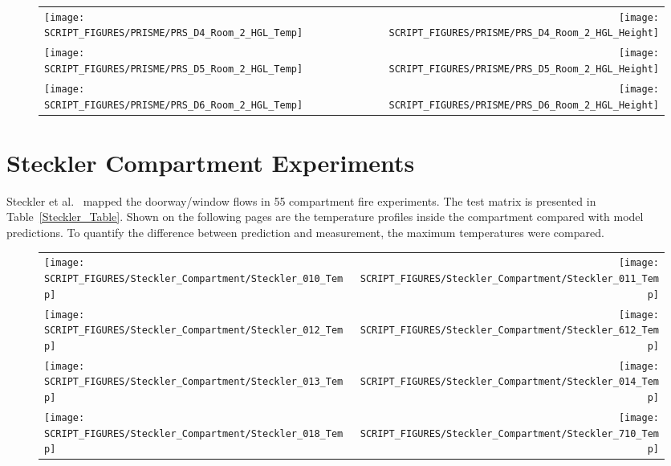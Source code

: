 \begin{figure}[p]
\begin{tabular*}{\textwidth}{l@{\extracolsep{\fill}}r}
\texttt{[image: SCRIPT\_FIGURES/PRISME/PRS\_D4\_Room\_2\_HGL\_Temp]} &
\texttt{[image: SCRIPT\_FIGURES/PRISME/PRS\_D4\_Room\_2\_HGL\_Height]} \\
\texttt{[image: SCRIPT\_FIGURES/PRISME/PRS\_D5\_Room\_2\_HGL\_Temp]} &
\texttt{[image: SCRIPT\_FIGURES/PRISME/PRS\_D5\_Room\_2\_HGL\_Height]} \\
\texttt{[image: SCRIPT\_FIGURES/PRISME/PRS\_D6\_Room\_2\_HGL\_Temp]} &
\texttt{[image: SCRIPT\_FIGURES/PRISME/PRS\_D6\_Room\_2\_HGL\_Height]}
\end{tabular*}
\label{PRISME_HGL_4}
\end{figure}


\clearpage

\section{Steckler Compartment Experiments}

Steckler et al.~\cite{Steckler:NBSIR_82-2520} mapped the doorway/window flows in 55 compartment fire experiments. The test matrix is presented in Table~\ref{Steckler_Table}. Shown on the following pages are the temperature profiles inside the compartment compared with model predictions. To quantify the difference between prediction and measurement, the maximum temperatures were compared.

\newpage

\begin{figure}[p]
\begin{tabular*}{\textwidth}{l@{\extracolsep{\fill}}r}
\texttt{[image: SCRIPT\_FIGURES/Steckler\_Compartment/Steckler\_010\_Temp]} &
\texttt{[image: SCRIPT\_FIGURES/Steckler\_Compartment/Steckler\_011\_Temp]} \\
\texttt{[image: SCRIPT\_FIGURES/Steckler\_Compartment/Steckler\_012\_Temp]} &
\texttt{[image: SCRIPT\_FIGURES/Steckler\_Compartment/Steckler\_612\_Temp]} \\
\texttt{[image: SCRIPT\_FIGURES/Steckler\_Compartment/Steckler\_013\_Temp]} &
\texttt{[image: SCRIPT\_FIGURES/Steckler\_Compartment/Steckler\_014\_Temp]} \\
\texttt{[image: SCRIPT\_FIGURES/Steckler\_Compartment/Steckler\_018\_Temp]} &
\texttt{[image: SCRIPT\_FIGURES/Steckler\_Compartment/Steckler\_710\_Temp]}
\end{tabular*}
\label{Steckler_Temp_1}
\end{figure}

